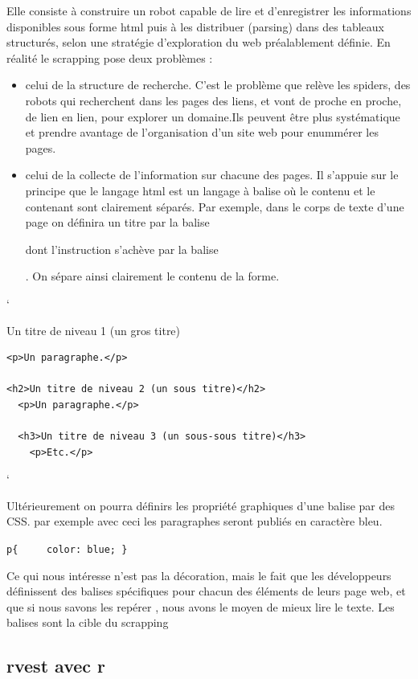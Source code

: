\documentclass[
]{book}
\providecommand{\tightlist}{%
  \setlength{\itemsep}{0pt}\setlength{\parskip}{0pt}}
\begin{document}
Elle consiste à construire un robot capable de lire et d'enregistrer les informations disponibles sous forme html puis à les distribuer (parsing) dans des tableaux structurés, selon une stratégie d'exploration du web préalablement définie. En réalité le scrapping pose deux problèmes :

\begin{itemize}
\tightlist
\item
  celui de la structure de recherche. C'est le problème que relève les spiders, des robots qui recherchent dans les pages des liens, et vont de proche en proche, de lien en lien, pour explorer un domaine.Ils peuvent être plus systématique et prendre avantage de l'organisation d'un site web pour enummérer les pages.
\item
  celui de la collecte de l'information sur chacune des pages. Il s'appuie sur le principe que le langage html est un langage à balise où le contenu et le contenant sont clairement séparés. Par exemple, dans le corps de texte d'une page on définira un titre par la balise

  dont l'instruction s'achève par la balise

  . On sépare ainsi clairement le contenu de la forme.
\end{itemize}

`

Un titre de niveau 1 (un gros titre)

\begin{verbatim}
<p>Un paragraphe.</p>

<h2>Un titre de niveau 2 (un sous titre)</h2>
  <p>Un paragraphe.</p>

  <h3>Un titre de niveau 3 (un sous-sous titre)</h3>
    <p>Etc.</p>
\end{verbatim}

`

Ultérieurement on pourra définirs les propriété graphiques d'une balise par des CSS. par exemple avec ceci les paragraphes seront publiés en caractère bleu.

\texttt{p\{\ \ \ \ \ color:\ blue;\ \}}

Ce qui nous intéresse n'est pas la décoration, mais le fait que les développeurs définissent des balises spécifiques pour chacun des éléments de leurs page web, et que si nous savons les repérer , nous avons le moyen de mieux lire le texte. Les balises sont la cible du scrapping

\hypertarget{rvest-avec-r}{%
\subsection{rvest avec r}\label{rvest-avec-r}}
\end{document}
